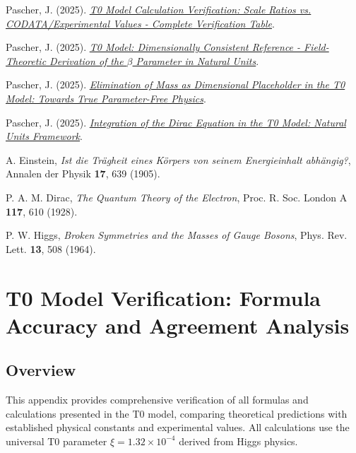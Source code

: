 \documentclass[12pt,a4paper]{article}
\begin{document}
	\begin{thebibliography}{9}
		Pascher, J. (2025). \href{https://github.com/jpascher/T0-Time-Mass-Duality/blob/main/2/pdf/Elimination_Of_Mass_Dirac_Tabelle.pdf}{\textit{T0 Model Calculation Verification: Scale Ratios vs. CODATA/Experimental Values - Complete Verification Table}}.
		
		Pascher, J. (2025). \href{https://github.com/jpascher/T0-Time-Mass-Duality/blob/main/2/pdf/DerivationVonBetaEn.pdf}{\textit{T0 Model: Dimensionally Consistent Reference - Field-Theoretic Derivation of the $\beta$ Parameter in Natural Units}}.
		
		Pascher, J. (2025). \href{https://github.com/jpascher/T0-Time-Mass-Duality/blob/main/2/pdf/EliminationOfMass.pdf}{\textit{Elimination of Mass as Dimensional Placeholder in the T0 Model: Towards True Parameter-Free Physics}}.
		
		Pascher, J. (2025). \href{https://github.com/jpascher/T0-Time-Mass-Duality/blob/main/2/pdf/diracEn.pdf}{\textit{Integration of the Dirac Equation in the T0 Model: Natural Units Framework}}.
		
		A. Einstein,
		\textit{Ist die Tr\"agheit eines K\"orpers von seinem Energieinhalt abh\"angig?},
		Annalen der Physik \textbf{17}, 639 (1905).
		
		P. A. M. Dirac,
		\textit{The Quantum Theory of the Electron},
		Proc. R. Soc. London A \textbf{117}, 610 (1928).
		
		P. W. Higgs,
		\textit{Broken Symmetries and the Masses of Gauge Bosons},
		Phys. Rev. Lett. \textbf{13}, 508 (1964).
		
	\end{thebibliography}
	\appendix
	
	\section{T0 Model Verification: Formula Accuracy and Agreement Analysis}
	\label{appendix:verification}
	
	\subsection{Overview}
	\label{subsec:verification_overview}
	
	This appendix provides comprehensive verification of all formulas and calculations presented in the T0 model, comparing theoretical predictions with established physical constants and experimental values. All calculations use the universal T0 parameter $\xi = 1.32 \times 10^{-4}$ derived from Higgs physics.
	
\end{document}
